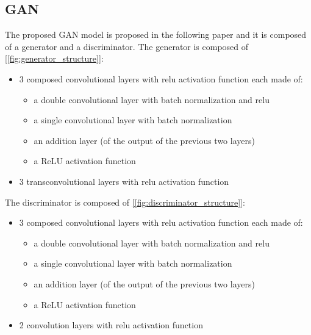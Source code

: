 \documentclass[a4paper]{sapthesis}
\begin{document}
\subsection{GAN}\label{sec:model_gan}
The proposed GAN model is proposed in the following paper \cite{GAN model}
and it is composed of a generator and a discriminator. \newline
The generator is composed of \hyperref[fig:generator_structure]{[\ref{fig:generator_structure}]}:
\begin{itemize}
\item 3 composed convolutional layers with relu activation function each
made of:
\begin{itemize}
\item a double convolutional layer with batch normalization and relu
\item a single convolutional layer with batch normalization 
\item an addition layer (of the output of the previous two layers)
\item a ReLU activation function
\end{itemize}
\item 3 transconvolutional layers with relu activation function
\end{itemize}
The discriminator is composed of \hyperref[fig:discriminator_structure]{[\ref{fig:discriminator_structure}]}:
\begin{itemize}
  \item 3 composed convolutional layers with relu activation function each
  made of:
  \begin{itemize}
  \item a double convolutional layer with batch normalization and relu
  \item a single convolutional layer with batch normalization 
  \item an addition layer (of the output of the previous two layers)
  \item a ReLU activation function
  \end{itemize}
  \item 2 convolution layers with relu activation function
\end{itemize}
\end{document}
